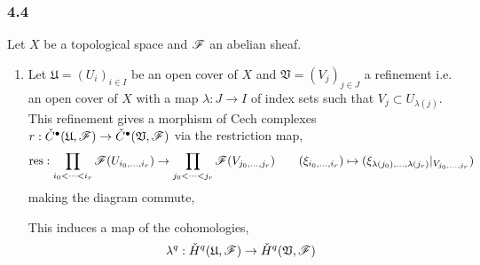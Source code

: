 \documentclass[12pt]{article}
\begin{document}
\subsubsection{4.4}

Let $X$ be a topological space and $\mathscr{F}$ an abelian sheaf. 

\renewcommand{\U}{\mathfrak{U}}
\newcommand{\V}{\mathfrak{V}}

\begin{enumerate}
\item Let $\U = (U_i)_{i \in I}$ be an open cover of $X$ and $\V = (V_j)_{j \in J}$ a refinement i.e. an open cover of $X$ with a map $\lambda : J \to I$ of index sets such that $V_{j} \subset U_{\lambda(j)}$.  This refinement gives a morphism of Cech complexes $r : \check{C}^\bullet(\U, \F) \to \check{C}^\bullet(\V, \F)$ via the restriction map,
\[ \mathrm{res} : \prod_{i_0 < \cdots < i_r} \mathscr{F}(U_{i_0, \dots, i_r}) \to \prod_{j_0 < \cdots < j_r} \mathscr{F}(V_{j_0, \dots, j_r}) \quad \quad (\xi_{i_0, \dots, i_r}) \mapsto (\xi_{\lambda(j_0), \dots, \lambda(j_r)} |_{V_{j_0, \dots, j_r}} ) \]
making the diagram commute,
\begin{center}
\end{center}
This induces a map of the cohomologies, 
\[ \lambda^q : \check{H}^q(\U, \F) \to \check{H}^q(\V, \F) \]


\end{enumerate}
\end{document}
